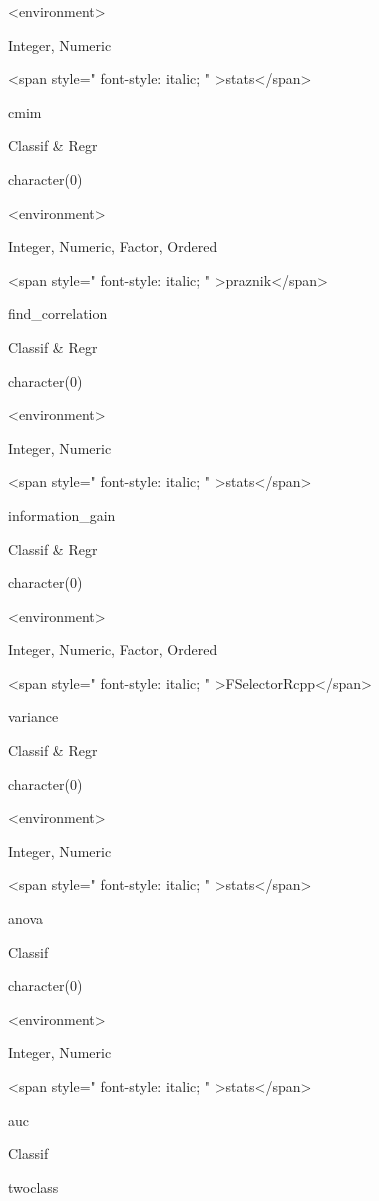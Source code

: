 \documentclass[]{article}
\begin{document}
\textless{}environment\textgreater{}

Integer, Numeric

\textless{}span style=" font-style: italic; " \textgreater{}stats\textless{}/span\textgreater{}

cmim

Classif \& Regr

character(0)

\textless{}environment\textgreater{}

Integer, Numeric, Factor, Ordered

\textless{}span style=" font-style: italic; " \textgreater{}praznik\textless{}/span\textgreater{}

find\_correlation

Classif \& Regr

character(0)

\textless{}environment\textgreater{}

Integer, Numeric

\textless{}span style=" font-style: italic; " \textgreater{}stats\textless{}/span\textgreater{}

information\_gain

Classif \& Regr

character(0)

\textless{}environment\textgreater{}

Integer, Numeric, Factor, Ordered

\textless{}span style=" font-style: italic; " \textgreater{}FSelectorRcpp\textless{}/span\textgreater{}

variance

Classif \& Regr

character(0)

\textless{}environment\textgreater{}

Integer, Numeric

\textless{}span style=" font-style: italic; " \textgreater{}stats\textless{}/span\textgreater{}

anova

Classif

character(0)

\textless{}environment\textgreater{}

Integer, Numeric

\textless{}span style=" font-style: italic; " \textgreater{}stats\textless{}/span\textgreater{}

auc

Classif

twoclass
\end{document}
